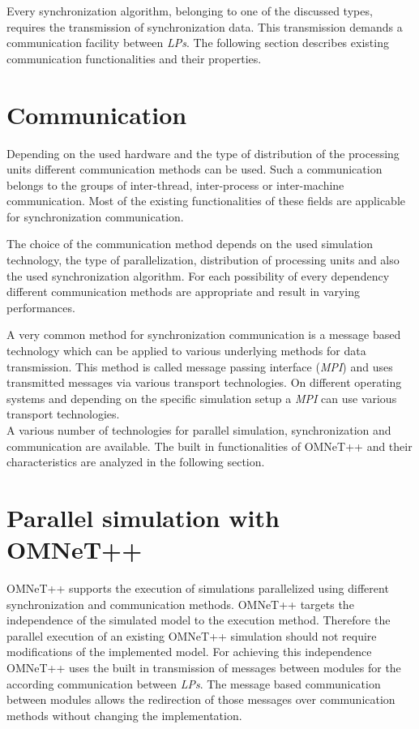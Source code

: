 Every synchronization algorithm, belonging to one of the discussed types, requires the transmission of synchronization data.
This transmission demands a communication facility between \emph{LPs}.
The following section describes existing communication functionalities and their properties.

\section{Communication}
\label{sec:parallel_communication}
Depending on the used hardware and the type of distribution of the processing units different communication methods can be used.
Such a communication belongs to the groups of inter-thread, inter-process or inter-machine communication.
Most of the existing functionalities of these fields are applicable for synchronization communication.

The choice of the communication method depends on the used simulation technology, the type of parallelization, distribution of processing units and also the used synchronization algorithm.
For each possibility of every dependency different communication methods are appropriate and result in varying performances.

A very common method for synchronization communication is a message based technology which can be applied to various underlying methods for data transmission.
This method is called message passing interface (\emph{MPI}) and uses transmitted messages via various transport technologies.
On different operating systems and depending on the specific simulation setup a \emph{MPI} can use various transport technologies.\cite{the_mpi_forum_mpi:_2015}
\\

A various number of technologies for  parallel simulation, synchronization and communication are available.
The built in functionalities of OMNeT++ and their characteristics are analyzed in the following section.

\section{Parallel simulation with OMNeT++}
\label{sec:parallel_omnet}
OMNeT++ supports the execution of simulations parallelized using different synchronization and communication methods.
OMNeT++ targets the independence of the simulated model to the execution method.
Therefore the parallel execution of an existing OMNeT++ simulation should not require modifications of the implemented model.
For achieving this independence OMNeT++ uses the built in transmission of messages between modules for the according communication between \emph{LPs}.
The message based communication between modules allows the redirection of those messages over communication methods without changing the implementation.

